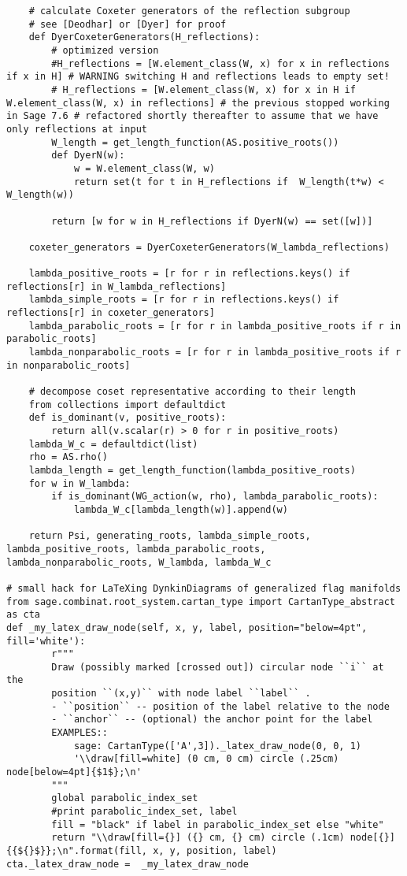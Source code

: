 \begin{verbatim}
    # calculate Coxeter generators of the reflection subgroup
    # see [Deodhar] or [Dyer] for proof
    def DyerCoxeterGenerators(H_reflections):
        # optimized version
        #H_reflections = [W.element_class(W, x) for x in reflections if x in H] # WARNING switching H and reflections leads to empty set!
        # H_reflections = [W.element_class(W, x) for x in H if W.element_class(W, x) in reflections] # the previous stopped working in Sage 7.6 # refactored shortly thereafter to assume that we have only reflections at input
        W_length = get_length_function(AS.positive_roots())
        def DyerN(w):
            w = W.element_class(W, w)
            return set(t for t in H_reflections if  W_length(t*w) < W_length(w))

        return [w for w in H_reflections if DyerN(w) == set([w])]

    coxeter_generators = DyerCoxeterGenerators(W_lambda_reflections)

    lambda_positive_roots = [r for r in reflections.keys() if reflections[r] in W_lambda_reflections]
    lambda_simple_roots = [r for r in reflections.keys() if reflections[r] in coxeter_generators]
    lambda_parabolic_roots = [r for r in lambda_positive_roots if r in parabolic_roots]
    lambda_nonparabolic_roots = [r for r in lambda_positive_roots if r in nonparabolic_roots]

    # decompose coset representative according to their length
    from collections import defaultdict
    def is_dominant(v, positive_roots):
        return all(v.scalar(r) > 0 for r in positive_roots)
    lambda_W_c = defaultdict(list)
    rho = AS.rho()
    lambda_length = get_length_function(lambda_positive_roots)
    for w in W_lambda:
        if is_dominant(WG_action(w, rho), lambda_parabolic_roots):
            lambda_W_c[lambda_length(w)].append(w)

    return Psi, generating_roots, lambda_simple_roots, lambda_positive_roots, lambda_parabolic_roots, lambda_nonparabolic_roots, W_lambda, lambda_W_c

# small hack for LaTeXing DynkinDiagrams of generalized flag manifolds
from sage.combinat.root_system.cartan_type import CartanType_abstract as cta
def _my_latex_draw_node(self, x, y, label, position="below=4pt", fill='white'):
        r"""
        Draw (possibly marked [crossed out]) circular node ``i`` at the
        position ``(x,y)`` with node label ``label`` .
        - ``position`` -- position of the label relative to the node
        - ``anchor`` -- (optional) the anchor point for the label
        EXAMPLES::
            sage: CartanType(['A',3])._latex_draw_node(0, 0, 1)
            '\\draw[fill=white] (0 cm, 0 cm) circle (.25cm) node[below=4pt]{$1$};\n'
        """
        global parabolic_index_set
        #print parabolic_index_set, label
        fill = "black" if label in parabolic_index_set else "white"
        return "\\draw[fill={}] ({} cm, {} cm) circle (.1cm) node[{}]{{${}$}};\n".format(fill, x, y, position, label)
cta._latex_draw_node =  _my_latex_draw_node


\end{verbatim}
